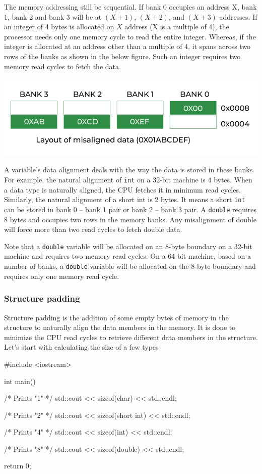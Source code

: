 \documentclass[../main]{subfiles}
\begin{document}
    The memory addressing still be sequential. If bank 0 occupies an address X, bank 1, bank 2 and bank 3 will be at $(X + 1)$, $(X + 2)$, and $(X + 3)$ addresses.
If an integer of 4 bytes is allocated on $X$ address (X is a multiple of 4), the processor needs only one memory cycle to read the entire integer.
Whereas, if the integer is allocated at an address other than a multiple of 4, it spans across two rows of the banks as shown in the below figure.
Such an integer requires two memory read cycles to fetch the data.
\begin{center}
    \includegraphics[scale=0.7]{Pictures/misaligned.png}
\end{center}

    A variable’s data alignment deals with the way the data is stored in these banks. For example, the natural alignment of \texttt{int} on a 32-bit machine is 4 bytes.
When a data type is naturally aligned, the CPU fetches it in minimum read cycles. Similarly, the natural alignment of a short int is 2 bytes. It means a short \texttt{int} can be stored
in bank 0 – bank 1 pair or bank 2 – bank 3 pair. A \texttt{double} requires 8 bytes and occupies two rows in the memory banks.
Any misalignment of double will force more than two read cycles to fetch double data.\newline

Note that a \texttt{double} variable will be allocated on an 8-byte boundary on a 32-bit machine and requires two memory read cycles.
On a 64-bit machine, based on a number of banks, a \texttt{double} variable will be allocated on the 8-byte boundary and requires only one memory read cycle.

\subsubsection{Structure padding}
    Structure padding is the addition of some empty bytes of memory in the structure to naturally align the data members in the memory.
It is done to minimize the CPU read cycles to retrieve different data members in the structure. Let's start with calculating the size of a few types
\begin{Code}
    #include <iostream>
    
    int main()
    {
        /* Prints "1" */
        std::cout << sizeof(char) << std::endl;
        
        /* Prints "2" */
        std::cout << sizeof(short int) << std::endl;
        
        /* Prints "4" */
        std::cout << sizeof(int) << std::endl;
        
        /* Prints "8" */
        std::cout << sizeof(double) << std::endl;
    
        return 0;
    }
\end{Code}
\end{document}
